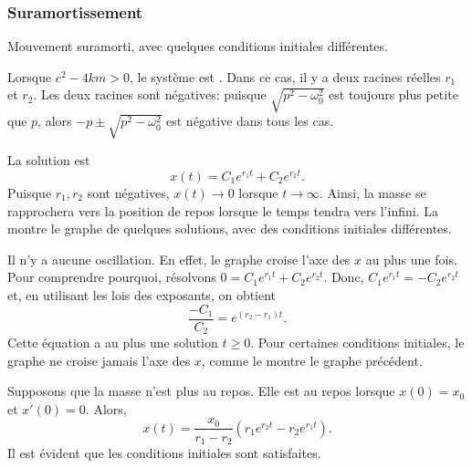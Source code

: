 \subsubsection{Suramortissement}

\begin{mywrapfig}[15]{3.25in}
\capstart
{}
\caption{Mouvement suramorti, avec quelques conditions initiales différentes.\label{mv:overdampedfig}}
\end{mywrapfig}
%
%

Lorsque $c^2 - 4km > 0$, le système est \emph{}.  
Dans ce cas, il y a deux racines réelles $r_1$ et $r_2$.  
Les deux racines sont négatives:   puisque $\sqrt{p^2 - \omega_0^2}$ est toujours plus petite que $p$,
alors $-p \pm \sqrt{p^2 - \omega_0^2}$ est négative dans tous les cas.


La solution est 
\begin{equation*}
	x(t) = C_1 e^{r_1 t} + C_2 e^{r_2 t} .
\end{equation*}
Puisque  $r_1, r_2$ sont négatives, $x(t) \to 0$ lorsque $t \to \infty$.
Ainsi, la masse se rapprochera vers la position de repos lorsque le temps tendra vers l'infini. 
La  montre 
le graphe de quelques solutions, avec des conditions initiales différentes.


Il n'y a aucune oscillation. En effet, le graphe croise l'axe des 
$x$ au plus une fois.  Pour comprendre pourquoi, résolvons 
$0 = C_1 e^{r_1 t} + C_2 e^{r_2 t}$.
Donc, $C_1 e^{r_1 t} = - C_2 e^{r_2 t}$ et, en utilisant les lois des exposants, on obtient  
\begin{equation*}
	\frac{-C_1}{C_2} = e^{(r_2-r_1) t} .
\end{equation*}
Cette équation a au plus une solution  $t \geq 0$.  
Pour certaines conditions initiales, le graphe ne croise jamais l'axe des $x$, 
comme le montre le graphe précédent. 

\begin{example}
	Supposons que la masse n'est plus au repos. Elle est au repos lorsque   
	$x(0) = x_0$ et $x'(0) = 0$.
	Alors,
	\begin{equation*}
		x(t) = \frac{x_0}{r_1-r_2} \left(r_1 e^{r_2 t} - r_2 e^{r_1 t} \right) .
	\end{equation*}
	Il est évident que les conditions initiales sont satisfaites.
\end{example}



